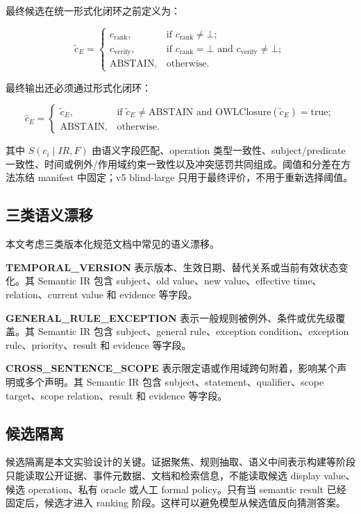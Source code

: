 \documentclass[11pt]{article}
\begin{document}
最终候选在统一形式化闭环之前定义为：

\[
\tilde{c}_E =
\begin{cases}
c_{\mathrm{rank}}, & \text{if } c_{\mathrm{rank}}\neq\bot;\\
c_{\mathrm{verify}}, & \text{if } c_{\mathrm{rank}}=\bot \text{ and } c_{\mathrm{verify}}\neq\bot;\\
\mathrm{ABSTAIN}, & \text{otherwise}.
\end{cases}
\]

最终输出还必须通过形式化闭环：

\[
\hat{c}_E =
\begin{cases}
\tilde{c}_E, & \text{if } \tilde{c}_E\neq\mathrm{ABSTAIN} \text{ and } \mathrm{OWLClosure}(\tilde{c}_E)=\mathrm{true};\\
\mathrm{ABSTAIN}, & \text{otherwise}.
\end{cases}
\]

其中 $S(c_i\mid IR,F)$ 由语义字段匹配、operation 类型一致性、subject/predicate 一致性、时间或例外/作用域约束一致性以及冲突惩罚共同组成。阈值和分差在方法冻结 manifest 中固定；v5 blind-large 只用于最终评价，不用于重新选择阈值。

\subsection{三类语义漂移}

本文考虑三类版本化规范文档中常见的语义漂移。

\textbf{TEMPORAL\_VERSION} 表示版本、生效日期、替代关系或当前有效状态变化。其 Semantic IR 包含 subject、old value、new value、effective time、relation、current value 和 evidence 等字段。

\textbf{GENERAL\_RULE\_EXCEPTION} 表示一般规则被例外、条件或优先级覆盖。其 Semantic IR 包含 subject、general rule、exception condition、exception rule、priority、result 和 evidence 等字段。

\textbf{CROSS\_SENTENCE\_SCOPE} 表示限定语或作用域跨句附着，影响某个声明或多个声明。其 Semantic IR 包含 subject、statement、qualifier、scope target、scope relation、result 和 evidence 等字段。

\subsection{候选隔离}

候选隔离是本文实验设计的关键。证据聚焦、规则抽取、语义中间表示构建等阶段只能读取公开证据、事件元数据、文档和检索信息，不能读取候选 display value、候选 operation、私有 oracle 或人工 formal policy。只有当 semantic result 已经固定后，候选才进入 ranking 阶段。这样可以避免模型从候选值反向猜测答案。
\end{document}
